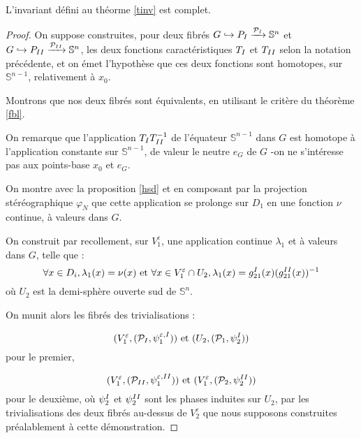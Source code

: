 \begin{theo}\label{tinvc}
L'invariant d\'efini au th\'eorme \ref{tinv} est complet.
\end{theo}

\begin{proof}
On suppose construites, pour deux fibrés $G \hookrightarrow P_{\Rom{1}} \xrightarrow{\mathcal{P}_{\Rom{1}}} \mathbb{S}^n$ %
et $G \hookrightarrow P_{\Rom{2}} \xrightarrow{\mathcal{P}_{\Rom{2}}} \mathbb{S}^n$, %
les deux fonctions caractéristiques $T_{\Rom{1}}$ et $T_{\Rom{2}}$ selon la notation précédente, %
et on émet l'hypothèse que ces deux fonctions sont homotopes, sur $\mathbb{S}^{n-1}$, relativement à $x_0$.

\par
Montrons que nos deux fibrés sont équivalents, en utilisant le critère du théorème \ref{fbl}.

\par
On remarque que l'application $T_{\Rom{1}} T_{\Rom{2}}^{-1}$ de l'équateur $\mathbb{S}^{n-1}$ dans $G$ est homotope à l'application constante sur $\mathbb{S}^{n-1}$, %
de valeur le neutre $e_G$ de $G$ -on ne s'intéresse pas aux points-base $x_0$ et $e_G$.

\par
On montre avec la proposition \ref{hsd} et en composant par la projection stéréographique $\varphi_N$ %
que cette application se prolonge sur $D_1$ en une fonction $\nu$ continue, à valeurs dans $G$.

\par
On construit par recollement, sur $V_1^{\varepsilon}$, une application continue $\lambda_1$ et à valeurs dans $G$, telle que :
\[\forall x \in D_i , \lambda_1(x) = \nu(x)\text{ et }\forall x \in V_1^{\varepsilon} \cap U_2 , \lambda_1 (x) = g^{\Rom{1}}_{21}(x) (g^{\Rom{2}}_{21}(x))^{-1}\]
où $U_2$ est la demi-sphère ouverte sud de $\mathbb{S}^n$.

On munit alors les fibrés des trivialisations :

\[(V_1^{\varepsilon},(\mathcal{P}_{\Rom{1}},\psi_1^{\varepsilon ,\Rom{1}}))\text{ et }(U_2,(\mathcal{P}_1,\psi_2^{\Rom{1}}))\]
pour le premier,

\[(V_1^{\varepsilon},(\mathcal{P}_{\Rom{2}},\psi_1^{\varepsilon ,\Rom{2}}))\text{ et }(V_1^{\varepsilon},(\mathcal{P}_2,\psi_2^{\Rom{2}}))\]
pour le deuxième, où $\psi_2^{\Rom{1}}$ et $\psi_2^{\Rom{2}}$ sont les phases induites sur $U_2$, %
par les trivialisations des deux fibrés au-dessus de $V_2^{\varepsilon}$ que nous supposons construites préalablement à cette démonstration.


\end{proof}

